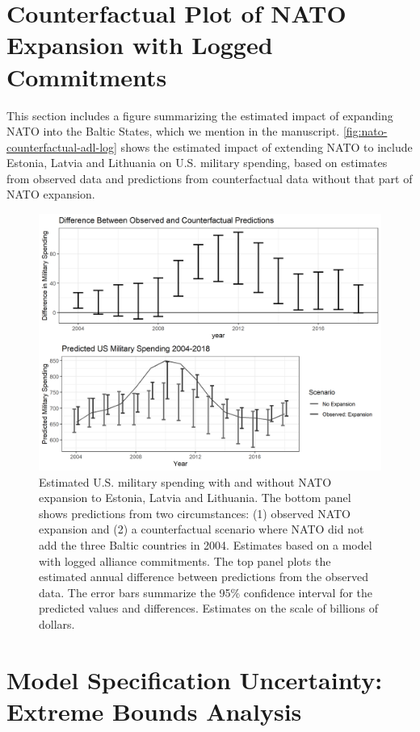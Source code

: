 \documentclass[12pt]{article}
\begin{document}
\section{Counterfactual Plot of NATO Expansion with Logged Commitments} 

This section includes a figure summarizing the estimated impact of expanding NATO into the Baltic States, which we mention in the manuscript. 
\autoref{fig:nato-counterfactual-adl-log} shows the estimated impact of extending NATO to include Estonia, Latvia and Lithuania on U.S. military spending, based on estimates from observed data and predictions from counterfactual data without that part of NATO expansion.  


\begin{figure} 
\includegraphics[width = .95\textwidth]{nato-counterfactual-adl-log.png}
\caption{Estimated U.S. military spending with and without NATO expansion to Estonia, Latvia and Lithuania. 
The bottom panel shows predictions from two circumstances: (1) observed NATO expansion and (2) a counterfactual scenario where NATO did not add the three Baltic countries in 2004. 
Estimates based on a model with logged alliance commitments. 
The top panel plots the estimated annual difference between predictions from the observed data. 
The error bars summarize the 95\% confidence interval for the predicted values and differences.
Estimates on the scale of billions of dollars.}
\label{fig:nato-counterfactual-adl-log}
\end{figure}




\section{Model Specification Uncertainty: Extreme Bounds Analysis} 
\end{document}
